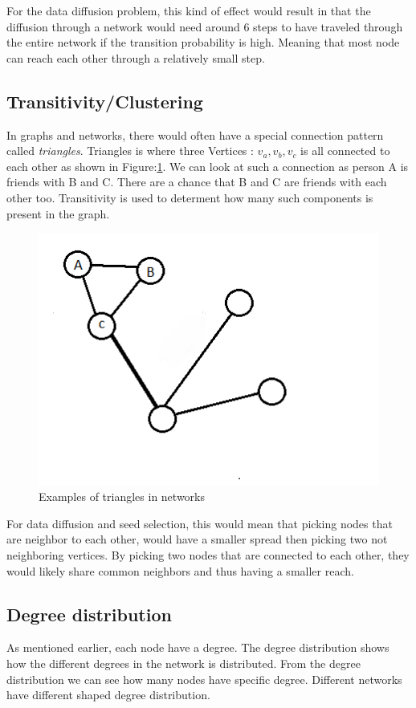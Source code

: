 For the data diffusion problem, this kind of effect would result in that the diffusion through a network would need around 6 steps to have traveled through the entire network if the transition probability is high. Meaning that most node can reach each other through a relatively small step.
\subsection{Transitivity/Clustering}
In graphs and networks, there would often have a special connection pattern called \textit{triangles}. Triangles is where three Vertices : $v_a,v_b,v_c$ is all connected to each other as shown in Figure:\ref{fig:triangleStruc}. We can look at such a connection as person A is friends with B and C. There are a chance that B and C are friends with each other too. Transitivity is used to determent how many such components is present in the graph.  

\begin{figure}
	\includegraphics{Figures/triangleStruc}
	\caption{Examples of triangles in networks} 
	\label{fig:triangleStruc}
\end{figure}


For data diffusion and seed selection, this would mean that picking nodes that are neighbor to each other, would have a smaller spread then picking two not neighboring vertices. By picking two nodes that are connected to each other, they would likely share common neighbors and thus having a smaller reach.  

\subsection{Degree distribution} \label{degreeDis}
As mentioned earlier, each node have a degree. The degree distribution shows how the different degrees in the network is distributed. From the degree distribution we can see how many nodes have specific degree. Different networks have different shaped degree distribution.

